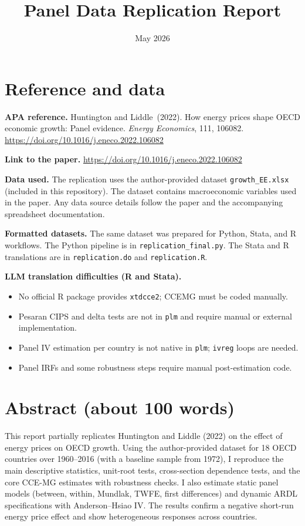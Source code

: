 \documentclass[11pt]{article}
\title{Panel Data Replication Report}
\author{\StudentName}
\date{May 2026}
\newcommand{\PaperTitle}{How energy prices shape OECD economic growth: Panel evidence}
\newcommand{\PaperAuthors}{Huntington and Liddle}
\newcommand{\PaperYear}{2022}
\newcommand{\PaperJournal}{Energy Economics}
\newcommand{\PaperVolume}{111}
\newcommand{\PaperPages}{106082}
\newcommand{\PaperDOI}{10.1016/j.eneco.2022.106082}
\begin{document}
\maketitle

\section*{Reference and data}
\textbf{APA reference.} \PaperAuthors\ (\PaperYear). \PaperTitle. \textit{\PaperJournal}, \PaperVolume, \PaperPages. \url{https://doi.org/\PaperDOI}

\textbf{Link to the paper.} \url{https://doi.org/\PaperDOI}

\textbf{Data used.} The replication uses the author-provided dataset \texttt{growth_EE.xlsx} (included in this repository). The dataset contains macroeconomic variables used in the paper. Any data source details follow the paper and the accompanying spreadsheet documentation.

\textbf{Formatted datasets.} The same dataset was prepared for Python, Stata, and R workflows. The Python pipeline is in \texttt{replication_final.py}. The Stata and R translations are in \texttt{replication.do} and \texttt{replication.R}.

\textbf{LLM translation difficulties (R and Stata).}
\begin{itemize}
  \item No official R package provides \texttt{xtdcce2}; CCEMG must be coded manually.
  \item Pesaran CIPS and delta tests are not in \texttt{plm} and require manual or external implementation.
  \item Panel IV estimation per country is not native in \texttt{plm}; \texttt{ivreg} loops are needed.
  \item Panel IRFs and some robustness steps require manual post-estimation code.
\end{itemize}

\section*{Abstract (about 100 words)}
This report partially replicates Huntington and Liddle (2022) on the effect of energy prices on OECD growth. Using the author-provided dataset for 18 OECD countries over 1960--2016 (with a baseline sample from 1972), I reproduce the main descriptive statistics, unit-root tests, cross-section dependence tests, and the core CCE-MG estimates with robustness checks. I also estimate static panel models (between, within, Mundlak, TWFE, first differences) and dynamic ARDL specifications with Anderson--Hsiao IV. The results confirm a negative short-run energy price effect and show heterogeneous responses across countries.
\end{document}
